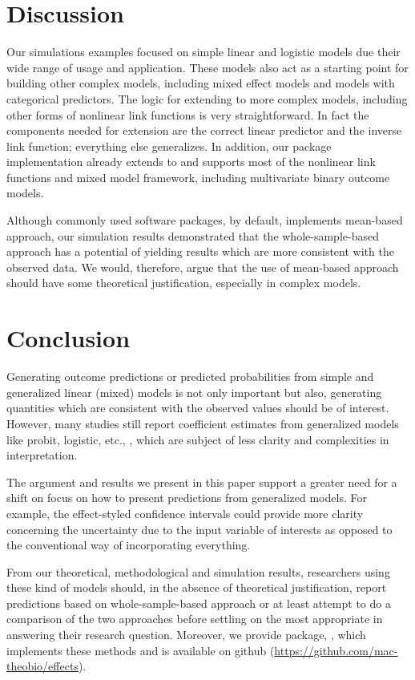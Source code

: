 \section{Discussion}

Our simulations examples focused on simple linear and logistic models due their wide range of usage and application. These models also act as a starting point for building other complex models, including mixed effect models and models with categorical predictors. The logic for extending to more complex models, including other forms of nonlinear link functions is very straightforward. In fact the components needed for extension are the correct linear predictor and the inverse link function; everything else generalizes. In addition, our  package implementation already extends to and supports most of the nonlinear link functions and mixed model framework, including multivariate binary outcome models.

Although commonly used  software packages, by default, implements mean-based approach, our simulation results demonstrated that the whole-sample-based approach has a potential of yielding results which are more consistent with the observed data. We would, therefore, argue that the use of mean-based approach should have some theoretical justification, especially in complex models. 

\section{Conclusion}

Generating outcome predictions or predicted probabilities from simple and generalized linear (mixed) models is not only important but also, generating quantities which are consistent with the observed values should be of interest. However, many studies still report coefficient estimates from generalized models like probit, logistic, etc., \citep{hanmer2013behind}, which are subject of less clarity and complexities in interpretation.

The argument and results we present in this paper support a greater need for a shift on focus on how to present predictions from generalized models. For example, the effect-styled confidence intervals could provide more clarity concerning the uncertainty due to the input variable of interests as opposed to the conventional way of incorporating everything. 

From our theoretical, methodological and simulation results, researchers using these kind of models should, in the absence of theoretical justification, report predictions based on whole-sample-based approach or at least attempt to do a comparison of the two approaches before settling on the most appropriate in answering their research question. Moreover, we provide  package, , which implements these methods and is available on github (\href{https://github.com/mac-theobio/effects}{https://github.com/mac-theobio/effects}).


